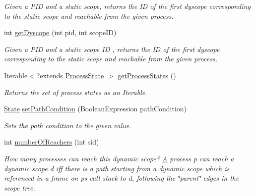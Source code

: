 \begin{DoxyCompactItemize}
\begin{DoxyCompactList}\small\item\em Given a P\+I\+D and a static scope, returns the I\+D of the first dyscope corresponding to the static scope and reachable from the given process. \end{DoxyCompactList}\item 
int \hyperlink{interfaceedu_1_1udel_1_1cis_1_1vsl_1_1civl_1_1state_1_1IF_1_1State_a55581f3667d4b3dd987873bbe8780d94}{get\+Dyscope} (int pid, int scope\+I\+D)
\begin{DoxyCompactList}\small\item\em Given a P\+I\+D and a static scope I\+D , returns the I\+D of the first dyscope corresponding to the static scope and reachable from the given process. \end{DoxyCompactList}\item 
Iterable$<$?extends \hyperlink{interfaceedu_1_1udel_1_1cis_1_1vsl_1_1civl_1_1state_1_1IF_1_1ProcessState}{Process\+State} $>$ \hyperlink{interfaceedu_1_1udel_1_1cis_1_1vsl_1_1civl_1_1state_1_1IF_1_1State_a6ffa3f7b2d0eb674c200a70171e378e7}{get\+Process\+States} ()
\begin{DoxyCompactList}\small\item\em Returns the set of process states as an {\ttfamily Iterable}. \end{DoxyCompactList}\item 
\hyperlink{interfaceedu_1_1udel_1_1cis_1_1vsl_1_1civl_1_1state_1_1IF_1_1State}{State} \hyperlink{interfaceedu_1_1udel_1_1cis_1_1vsl_1_1civl_1_1state_1_1IF_1_1State_a548f4bc15460a2966c9e808c30e2895d}{set\+Path\+Condition} (Boolean\+Expression path\+Condition)
\begin{DoxyCompactList}\small\item\em Sets the path condition to the given value. \end{DoxyCompactList}\item 
int \hyperlink{interfaceedu_1_1udel_1_1cis_1_1vsl_1_1civl_1_1state_1_1IF_1_1State_a4ec2455adf73710a9e19c826fb78902a}{number\+Of\+Reachers} (int sid)
\begin{DoxyCompactList}\small\item\em How many processes can reach this dynamic scope? \hyperlink{structA}{A} process p can reach a dynamic scope d iff there is a path starting from a dynamic scope which is referenced in a frame on p\textquotesingle{}s call stack to d, following the \char`\"{}parent\char`\"{} edges in the scope tree. \end{DoxyCompactList}\item 

\end{DoxyCompactItemize}
